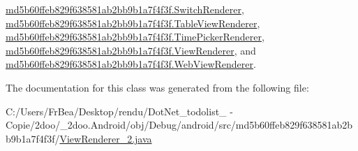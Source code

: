 \hyperlink{classmd5b60ffeb829f638581ab2bb9b1a7f4f3f_1_1_switch_renderer_d6c93485d20d2c459c3ad2829f699a70}{md5b60ffeb829f638581ab2bb9b1a7f4f3f.SwitchRenderer}, \hyperlink{classmd5b60ffeb829f638581ab2bb9b1a7f4f3f_1_1_table_view_renderer_98f8a583ce568ff85385a44cc922c5d1}{md5b60ffeb829f638581ab2bb9b1a7f4f3f.TableViewRenderer}, \hyperlink{classmd5b60ffeb829f638581ab2bb9b1a7f4f3f_1_1_time_picker_renderer_c8725b3e7813e45a02000d4b84812e6f}{md5b60ffeb829f638581ab2bb9b1a7f4f3f.TimePickerRenderer}, \hyperlink{classmd5b60ffeb829f638581ab2bb9b1a7f4f3f_1_1_view_renderer_0833259dc6ac4a65396cf7f3fedd9f17}{md5b60ffeb829f638581ab2bb9b1a7f4f3f.ViewRenderer}, and \hyperlink{classmd5b60ffeb829f638581ab2bb9b1a7f4f3f_1_1_web_view_renderer_729d3e7508c2fcb66b26f19a378f0efe}{md5b60ffeb829f638581ab2bb9b1a7f4f3f.WebViewRenderer}.

The documentation for this class was generated from the following file:\begin{CompactItemize}
\item 
C:/Users/FrBea/Desktop/rendu/DotNet\_\-todolist\_ - Copie/2doo/\_\-2doo.Android/obj/Debug/android/src/md5b60ffeb829f638581ab2bb9b1a7f4f3f/\hyperlink{md5b60ffeb829f638581ab2bb9b1a7f4f3f_2_view_renderer__2_8java}{ViewRenderer\_\-2.java}\end{CompactItemize}
